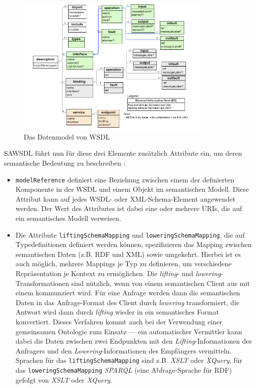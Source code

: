 \begin{figure}[ht]
\centering
\parbox{0.85\textwidth}{
    \includegraphics[width=0.85\textwidth]{media/WSDL20InfosetModel.png}
    \caption{Das Datenmodel von \ac{WSDL}}
    \label{f:wsdlmodel}
}
\end{figure}

\ac{SAWSDL} führt nun für diese drei Elemente zusätzlich Attribute ein, um deren semantische Bedeutung zu beschreiben \cite[S.62ff]{ky-sawsdl}:

\begin{itemize}
\item \texttt{modelReference} definiert eine Beziehung zwischen einem der definierten Komponente in der \ac{WSDL} und einem Objekt im semantischen Modell. Diese Attribut kann auf jedes \ac{WSDL}- oder XML-Schema-Element angewendet werden. Der Wert des Attributes ist dabei eine oder mehrere URIs, die auf ein semantisches Modell verweisen.
\item Die Attribute \texttt{liftingSchemaMapping} und \texttt{loweringSchemaMapping}, die auf Typedefinitionen definiert werden können, spezifizieren das Mapping zwischen semantischen Daten (z.B. \ac{RDF} und XML) sowie umgekehrt. Hierbei ist es auch möglich, mehrere Mappings je Typ zu definieren, um verschiedene Repräsentation je Kontext zu ermöglichen. Die \emph{lifting}- und \emph{lowering}-Transformationen sind nützlich, wenn von einem semantischen Client aus mit einem \ws kommunziert wird. Für eine Anfrage werden dann die semantischen Daten in das Anfrage-Format des Client durch \emph{lowering} transformiert, die Antwort wird dann durch \emph{lifting} wieder in ein semantisches Format konvertiert. Dieses Verfahren kommt auch bei der Verwendung einer gemeinsamen Ontologie zum Einsatz --- ein automatischer Vermittler kann dabei die Daten zwischen zwei Endpunkten mit den \emph{Lifting}-Informationen des Anfragers und den \emph{Lowering}-Informationen des Empfängers vermitteln. Sprachen für das \texttt{liftingSchemaMapping} sind z.B. \emph{XSLT} oder \emph{XQuery}, für das \texttt{loweringSchemaMapping} \emph{SPARQL} (eine Abfrage-Sprache für \ac{RDF}) gefolgt von \emph{XSLT} oder \emph{XQuery}.
\end{itemize}

